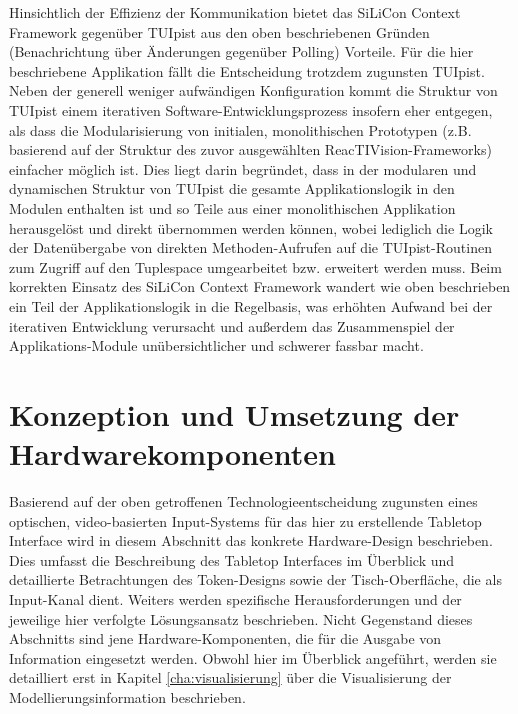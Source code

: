 Hinsichtlich der Effizienz der Kommunikation bietet das SiLiCon Context Framework gegenüber TUIpist aus den oben beschriebenen Gründen (Benachrichtung über Änderungen gegenüber Polling) Vorteile. Für die hier beschriebene Applikation fällt die Entscheidung trotzdem zugunsten TUIpist. Neben der generell weniger aufwändigen Konfiguration kommt die Struktur von TUIpist einem iterativen Software-Entwicklungsprozess insofern eher entgegen, als dass die Modularisierung von initialen, monolithischen Prototypen (z.B. basierend auf der Struktur des zuvor ausgewählten ReacTIVision-Frameworks) einfacher möglich ist. Dies liegt darin begründet, dass in der modularen und dynamischen Struktur von TUIpist die gesamte Applikationslogik in den Modulen enthalten ist und so Teile aus einer monolithischen Applikation herausgelöst und direkt übernommen werden können, wobei lediglich die Logik der Datenübergabe von direkten Methoden-Aufrufen auf die TUIpist-Routinen zum Zugriff auf den Tuplespace umgearbeitet bzw. erweitert werden muss. Beim korrekten Einsatz des SiLiCon Context Framework wandert wie oben beschrieben ein Teil der Applikationslogik in die Regelbasis, was erhöhten Aufwand bei der iterativen Entwicklung verursacht und außerdem das Zusammenspiel der Applikations-Module unübersichtlicher und schwerer fassbar macht.



\section{Konzeption und Umsetzung der Hardwarekomponenten} %
\label{sec:konzeption_und_umsetzung_der_hardwarekomponenten}

Basierend auf der oben getroffenen Technologieentscheidung zugunsten eines optischen, video-basierten Input-Systems für das hier zu erstellende Tabletop Interface wird in diesem Abschnitt das konkrete Hardware-Design beschrieben. Dies umfasst die Beschreibung des Tabletop Interfaces im Überblick und detaillierte Betrachtungen des Token-Designs sowie der Tisch-Oberfläche, die als Input-Kanal dient. Weiters werden spezifische Herausforderungen und der jeweilige hier verfolgte Lösungsansatz beschrieben. Nicht Gegenstand dieses Abschnitts sind jene Hardware-Komponenten, die für die Ausgabe von Information eingesetzt werden. Obwohl hier im Überblick angeführt, werden sie detailliert erst in Kapitel \ref{cha:visualisierung} über die Visualisierung der Modellierungsinformation beschrieben.

